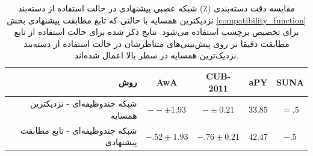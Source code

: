 \begin{table}[t]
\caption [دقت دسته‌بندی با شبکه عصبی به همراه تابع مطابقت پیشنهادی]{
مقایسه دقت دسته‌بندی (٪) شبکه عصبی پیشنهادی در حالت استفاده از دسته‌بند نزدیکترین همسایه با حالتی که تابع مطابقت پیشنهادی بخش  \ref{compatibility_function} برای تخصیص برچسب استفاده می‌شود.
نتایج ذکر شده برای حالت استفاده از تابع مطابقت دقیقا بر روی پیش‌بینی‌های متناظرشان در حالت استفاده از دسته‌بند نزدیک‌ترین همسایه در سطر بالا اعمال شده‌اند.
}
\label{tab:nn_comp}
\begin{tabular}{|r|c|c|c|c|}
\hline
روش  & AwA & CUB-2011 & aPY & SUNA \\
\hline
شبکه چندوظیفه‌ای - نزدیکترین همسایه
                      & {${-- \pm 1.93}$}  & {${- \pm 0.21}$} & {$33.85$} & { ${=.5}$} \\ \hline
شبکه  چندوظیفه‌ای - تابع مطابقت پیشنهادی
                      & {${-.52 \pm 1.93}$}  & \textbf{${-.76 \pm 0.21}$} & \textbf{$\mathbf{42.47}$} & \textbf{ ${-.5}$} \\ \hline
\end{tabular}

\end{table}

